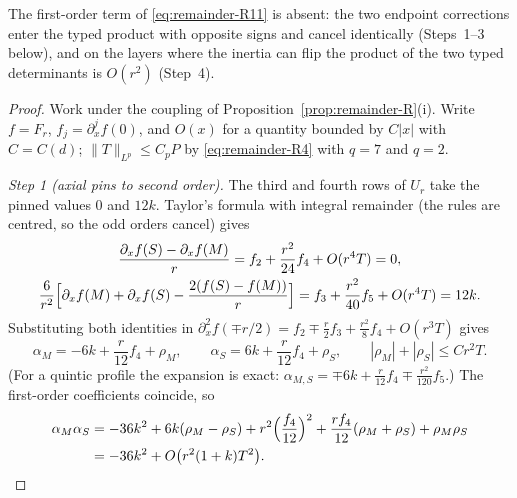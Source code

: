 The first-order term of \eqref{eq:remainder-R11} is absent: the two endpoint corrections enter the typed product with opposite signs and cancel identically (Steps~1--3 below), and on the layers where the inertia can flip the product of the two typed determinants is $O(r^2)$ (Step~4).

\begin{proof}
Work under the coupling of Proposition~\ref{prop:remainder-R}(i). Write $f=F_r$, $f_j=\partial_x^jf(0)$, and $O(x)$ for a quantity bounded by $C|x|$ with $C=C(d)$; $\|T\|_{L^p}\le C_pP$ by \eqref{eq:remainder-R4} with $q=7$ and $q=2$.

\emph{Step 1 (axial pins to second order).} The third and fourth rows of $U_r$ take the pinned values $0$ and $12k$. Taylor's formula with integral remainder (the rules are centred, so the odd orders cancel) gives
\[
\begin{gathered}
\frac{\partial_xf(S)-\partial_xf(M)}r=f_2+\frac{r^2}{24}f_4+O(r^4T)=0,\\
\frac6{r^2}\Bigl[\partial_xf(M)+\partial_xf(S)-\frac{2(f(S)-f(M))}r\Bigr]=f_3+\frac{r^2}{40}f_5+O(r^4T)=12k .
\end{gathered}
\]
Substituting both identities in $\partial_x^2f(\mp r/2)=f_2\mp\tfrac r2f_3+\tfrac{r^2}8f_4+O(r^3T)$ gives
\begin{equation}\label{eq:remainder-alpha}
\alpha_M=-6k+\frac r{12}f_4+\rho_M,\qquad \alpha_S=6k+\frac r{12}f_4+\rho_S,\qquad |\rho_M|+|\rho_S|\le Cr^2T .
\end{equation}
(For a quintic profile the expansion is exact: $\alpha_{M,S}=\mp6k+\frac r{12}f_4\mp\frac{r^2}{120}f_5$.) The first-order coefficients coincide, so
\begin{equation}\label{eq:remainder-alphaprod}
\begin{aligned}
\alpha_M\alpha_S&=-36k^2+6k(\rho_M-\rho_S)+r^2\Bigl(\frac{f_4}{12}\Bigr)^2+\frac{rf_4}{12}(\rho_M+\rho_S)+\rho_M\rho_S\\
&=-36k^2+O\bigl(r^2(1+k)T^2\bigr).
\end{aligned}
\end{equation}


\end{proof}
